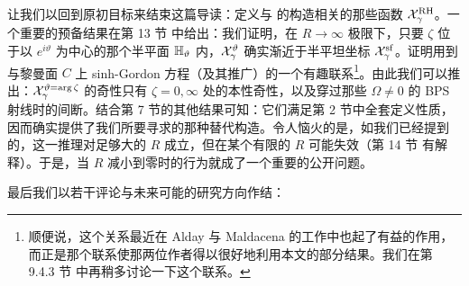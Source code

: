 让我们以回到原初目标来结束这篇导读：定义与 \cite{Gaiotto:2008cd} 的构造相关的那些函数 $\mathcal{X}^{\rm RH}_\gamma$。一个重要的预备结果在第 13 节%
中给出：我们证明，在 $R\to \infty$ 极限下，只要 $\zeta$ 位于以 $e^{i \vartheta}$ 为中心的那个半平面 ${\mathbb{H}}_{\vartheta}$ 内，$\mathcal{X}_{\gamma}^{\vartheta}$ 确实渐近于半平坦坐标 $\mathcal{X}_{\gamma}^{{\mathrm{sf}}}$。证明用到与黎曼面 $C$ 上 sinh-Gordon 方程（及其推广）的一个有趣联系\footnote{顺便说，这个关系最近在 Alday 与 Maldacena 的工作\cite{Alday:2009yn}中也起了有益的作用，而正是那个联系使那两位作者得以很好地利用本文的部分结果。我们在第 9.4.3 节%
中再稍多讨论一下这个联系。}。由此我们可以推出：$\mathcal{X}_{\gamma}^{\vartheta = \arg \zeta}$ 的奇性只有 $\zeta = 0,\infty$ 处的本性奇性，以及穿过那些 $\Omega\not=0$ 的 BPS 射线时的间断。结合第 7 节的其他结果可知：它们满足第 2 节中全套定义性质，因而确实提供了我们所要寻求的那种替代构造。令人恼火的是，如我们已经提到的，这一推理对足够大的 $R$ 成立，但在某个有限的 $R$ 可能失效（第 14 节%
有解释）。于是，当 $R$ 减小到零时的行为就成了一个重要的公开问题。

最后我们以若干评论与未来可能的研究方向作结：

